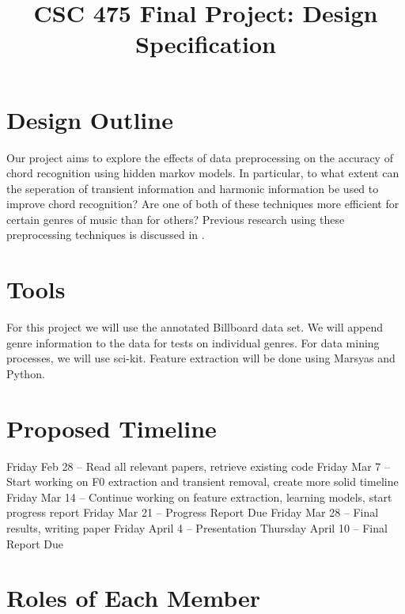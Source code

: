 \documentclass{article}
\title{CSC 475 Final Project: Design Specification}
\begin{document}
%
\maketitle
%

\section{Design Outline}\label{sec:desoutline}
Our project aims to explore the effects of data preprocessing on the accuracy
of chord recognition using hidden markov models. In particular, to what extent
can the seperation of transient information and harmonic information be used to
improve chord recognition? Are one of both of these techniques more efficient
for certain genres of music than for others? Previous research using these
preprocessing techniques is discussed in \cite{McVicar:00}.

\section{Tools}\label{sec:tools}

For this project we will use the annotated Billboard data set. We will
append genre information to the data for tests on individual genres. For data
mining processes, we will use sci-kit. Feature extraction will be done using
Marsyas and Python.

\section{Proposed Timeline}\label{sec:timeline}

Friday Feb 28 -- Read all relevant papers, retrieve existing code \newline
Friday Mar 7 -- Start working on F0 extraction and transient removal, create
more solid timeline \newline Friday Mar 14 -- Continue working on feature
extraction, learning models, start progress report \newline Friday Mar 21 --
Progress Report Due \newline Friday Mar 28 -- Final results, writing paper
\newline Friday April 4 -- Presentation \newline Thursday April 10 -- Final
Report Due

\section{Roles of Each Member}
\end{document}

